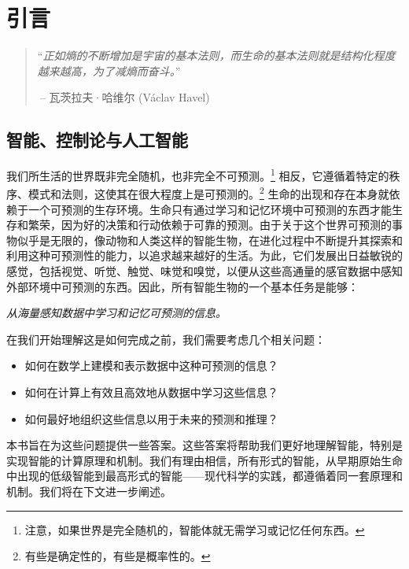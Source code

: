 \documentclass[../../book-main.tex]{subfiles}
\begin{document}
\chapter{引言}
\label{ch:intro}

\begin{quote}
“{\em 正如熵的不断增加是宇宙的基本法则，而生命的基本法则就是结构化程度越来越高，为了减熵而奋斗。}”

$~$\hfill -- 瓦茨拉夫·哈维尔 (V\'{a}clav Havel)
 \end{quote}
\vspace{5mm}



\section{智能、控制论与人工智能}
我们所生活的世界既非完全随机，也非完全不可预测。\footnote{注意，如果世界是完全随机的，智能体就无需学习或记忆任何东西。} 相反，它遵循着特定的秩序、模式和法则，这使其在很大程度上是可预测的。\footnote{有些是确定性的，有些是概率性的。} 生命的出现和存在本身就依赖于一个可预测的生存环境。生命只有通过学习和记忆环境中可预测的东西才能生存和繁荣，因为好的决策和行动依赖于可靠的预测。由于关于这个世界可预测的事物似乎是无限的，像动物和人类这样的智能生物，在进化过程中不断提升其探索和利用这种可预测性的能力，以追求越来越好的生活。为此，它们发展出日益敏锐的感觉，包括视觉、听觉、触觉、味觉和嗅觉，以便从这些高通量的感官数据中感知外部环境中可预测的东西。因此，所有智能生物的一个基本任务是能够：
\begin{center}
    {\em 从海量感知数据中学习和记忆可预测的信息。}
\end{center}
在我们开始理解这是如何完成之前，我们需要考虑几个相关问题：
\begin{itemize}
    \item 如何在数学上建模和表示数据中这种可预测的信息？
    \item 如何在计算上有效且高效地从数据中学习这些信息？
    \item 如何最好地组织这些信息以用于未来的预测和推理？
\end{itemize}
本书旨在为这些问题提供一些答案。这些答案将帮助我们更好地理解智能，特别是实现智能的计算原理和机制。我们有理由相信，所有形式的智能，从早期原始生命中出现的低级智能到最高形式的智能——现代科学的实践，都遵循着同一套原理和机制。我们将在下文进一步阐述。
\end{document}

